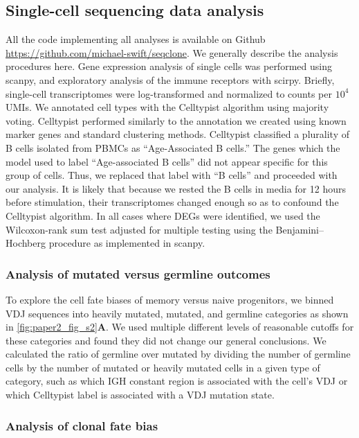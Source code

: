 \subsection{Single-cell sequencing data analysis}

All the code implementing all analyses is available on Github \url{https://github.com/michael-swift/seqclone}. We generally describe the analysis procedures here. Gene expression analysis of single cells was performed using scanpy\cite{wolf_scanpy_2018}, and exploratory analysis of the immune receptors with scirpy. Briefly, single-cell transcriptomes were log-transformed and normalized to counts per $10^4$ UMIs. We annotated cell types with the Celltypist algorithm using majority voting. Celltypist performed similarly to the annotation we created using known marker genes and standard clustering methods. Celltypist classified a plurality of B cells isolated from PBMCs as “Age-Associated B cells.” The genes which the model used to label “Age-associated B cells” did not appear specific for this group of cells. Thus, we replaced that label with “B cells” and proceeded with our analysis. It is likely that because we rested the B cells in media for 12 hours before stimulation, their transcriptomes changed enough so as to confound the Celltypist algorithm. In all cases where DEGs were identified, we used the Wilcoxon-rank sum test adjusted for multiple testing using the Benjamini–Hochberg procedure as implemented in scanpy.
\subsubsection{Analysis of mutated versus germline outcomes}

To explore the cell fate biases of memory versus naive progenitors, we binned VDJ sequences into heavily mutated, mutated, and germline categories as shown in \ref{fig:paper2_fig_s2}\textbf{A}. We used multiple different levels of reasonable cutoffs for these categories and found they did not change our general conclusions. We calculated the ratio of germline over mutated by dividing the number of germline cells by the number of mutated or heavily mutated cells in a given type of category, such as which IGH constant region is associated with the cell’s VDJ or which Celltypist label is associated with a VDJ mutation state.

\subsubsection{Analysis of clonal fate bias}

